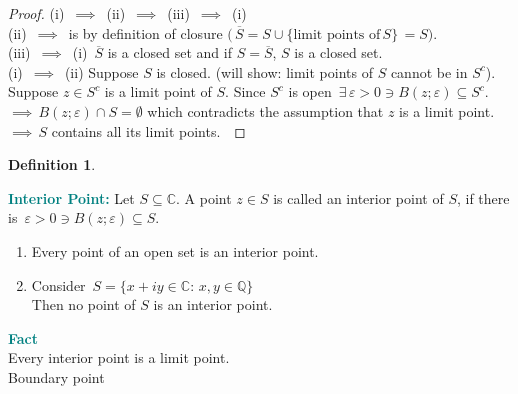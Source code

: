 \documentclass[11pt,a4paper]{article}
\theoremstyle{definition}
\newtheorem{definition}[thm]{Definition}
\begin{document}
\begin{proof}

(i) $\, \implies\,$ (ii) $\, \implies \,$ (iii) $\,\implies\,$ (i)\\

(ii) $\, \implies \,$ is by definition of closure  $\big(\, \overline{S} = S\cup \big\{\text{limit points of}\, S\big\}\, = S\big)$.\\

(iii) $\, \implies \,$ (i) $\,\overline{S}$ is a closed set and if $S = \overline{S}$, $S$ is a closed set.\\

(i) $\, \implies \,$ (ii) Suppose $S$ is closed. (will show: limit points of $S$ cannot be in $S^c$).
Suppose $z \in S^c$ is a limit point of $S$. Since $S^c$ is open $\, \exists\, \varepsilon > 0 \ni B(z; \varepsilon ) \subseteq S^c$. $\implies \, B(z;\varepsilon) \cap S = \emptyset$ which contradicts the assumption that $z$ is a limit point.\\
$\implies\, S$ contains all its limit points.\
\end{proof}

\begin{definition}

\end{definition}

\textbf{\textcolor{teal}{Interior Point:}} Let $S\subseteq \mathbb{C}$. A point $z\in S$ is called an interior point of $S$, if there is $\, \varepsilon > 0 \ni B(z; \varepsilon) \subseteq S$.\\

\begin{enumerate}
\item Every point of an open set is an interior point.
\item Consider $\, S = \big\{ x+ iy\in \mathbb{C}:\, x,y \in \mathbb{Q}\big\}$\\
Then no point of $S$ is an interior point.\\

\end{enumerate}




\textbf{\textcolor{teal}{Fact}}\\
Every interior point is a limit point.\\









Boundary point\\
\end{document}
